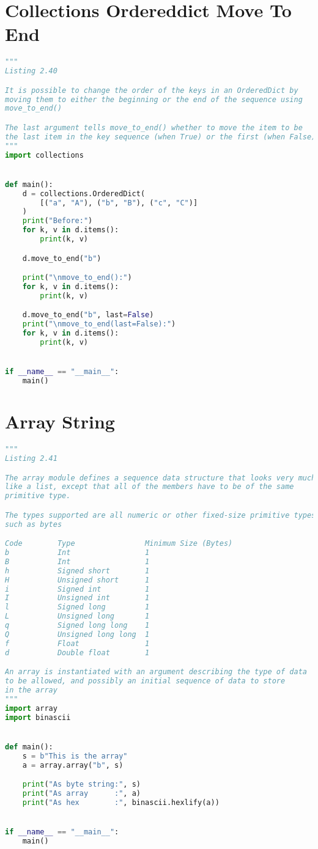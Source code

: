 \documentclass[a4paper,landscape]{report}
\begin{document}
\section{Collections Ordereddict Move To End}
\begin{lstlisting}[language=Python]
"""
Listing 2.40

It is possible to change the order of the keys in an OrderedDict by
moving them to either the beginning or the end of the sequence using
move_to_end()

The last argument tells move_to_end() whether to move the item to be
the last item in the key sequence (when True) or the first (when False)
"""
import collections


def main():
    d = collections.OrderedDict(
        [("a", "A"), ("b", "B"), ("c", "C")]
    )
    print("Before:")
    for k, v in d.items():
        print(k, v)

    d.move_to_end("b")

    print("\nmove_to_end():")
    for k, v in d.items():
        print(k, v)

    d.move_to_end("b", last=False)
    print("\nmove_to_end(last=False):")
    for k, v in d.items():
        print(k, v)


if __name__ == "__main__":
    main()

\end{lstlisting}
\section{Array String}
\begin{lstlisting}[language=Python]
"""
Listing 2.41

The array module defines a sequence data structure that looks very much
like a list, except that all of the members have to be of the same
primitive type.

The types supported are all numeric or other fixed-size primitive types
such as bytes

Code        Type                Minimum Size (Bytes)
b           Int                 1
B           Int                 1
h           Signed short        1
H           Unsigned short      1
i           Signed int          1
I           Unsigned int        1
l           Signed long         1
L           Unsigned long       1
q           Signed long long    1
Q           Unsigned long long  1
f           Float               1
d           Double float        1

An array is instantiated with an argument describing the type of data
to be allowed, and possibly an initial sequence of data to store
in the array
"""
import array
import binascii


def main():
    s = b"This is the array"
    a = array.array("b", s)

    print("As byte string:", s)
    print("As array      :", a)
    print("As hex        :", binascii.hexlify(a))


if __name__ == "__main__":
    main()

\end{lstlisting}
\end{document}
